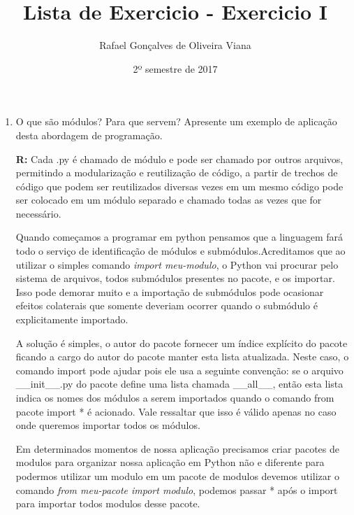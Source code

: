 \documentclass[12pt]{article}
\title{Lista de Exercicio  - Exercicio I }
\author{Rafael Gonçalves de  Oliveira Viana}
\date{2º semestre de 2017}
\begin{document}
\maketitle

\begin{enumerate}
\item
O que são módulos? Para que servem? Apresente um exemplo de aplicação desta
abordagem de programação.

\textbf{R:}
Cada .py é chamado de módulo e pode ser chamado por outros arquivos, permitindo a modularização e reutilização de código, a partir de trechos de código que podem ser reutilizados diversas vezes em um mesmo código pode ser colocado em um módulo separado e chamado todas as vezes que for necessário.

Quando começamos a programar em python pensamos que a linguagem fará todo o serviço de identificação de módulos e submódulos.Acreditamos que ao utilizar o simples comando \textit{import meu-modulo}, o Python vai procurar pelo sistema de arquivos, todos submódulos presentes no pacote, e os importar. Isso pode demorar muito e a importação de submódulos pode ocasionar efeitos colaterais que somente deveriam ocorrer quando o submódulo é explicitamente importado.

A solução é simples, o autor do pacote fornecer um índice explícito do pacote ficando a cargo do autor do pacote manter esta lista atualizada. Neste caso, o comando import pode ajudar pois ele usa a seguinte convenção: se o arquivo \_\_init\_\_.py do pacote define uma lista chamada \_\_all\_\_, então esta lista indica os nomes dos módulos a serem importados quando o comando from pacote import * é acionado. Vale ressaltar que isso é válido apenas no caso onde queremos importar todos os módulos.

Em determinados momentos de nossa aplicação precisamos criar pacotes de modulos para organizar nossa aplicação em Python não e diferente para podermos utilizar um modulo em um pacote de modulos devemos utilizar o comando \textit{from meu-pacote import modulo}, podemos passar * após o import para importar todos modulos desse pacote.


\end{enumerate}
\end{document}
